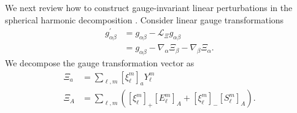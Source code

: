 \documentclass[12pt]{report}
\begin{document}
We next review how to construct gauge-invariant linear perturbations
in the spherical harmonic decomposition \cite{Martel:2005ir}.
Consider linear gauge transformations
\begin{align}
    g^{\prime}_{\alpha\beta}
    &= 
    g_{\alpha\beta}
    -
    \mathcal{L}_{\Xi}g_{\alpha\beta}
    \nonumber\\
    &= 
    g_{\alpha\beta}
    -
    \nabla_{\alpha}\Xi_{\beta}
    -
    \nabla_{\beta}\Xi_{\alpha}
    .
\end{align}
We decompose the gauge transformation vector as
\begin{subequations}
\begin{align}
    \Xi_a
    &=
    \sum_{\ell,m} \left[\xi^m_{\ell}\right]_a Y^m_{\ell}
    \\
    \Xi_A
    &=
    \sum_{\ell,m}\left(
        \left[\xi^m_{\ell}\right]_+ \left[E^m_{\ell}\right]_A
        +
        \left[\xi^m_{\ell}\right]_- \left[S^m_{\ell}\right]_A
    \right)
    .
\end{align}
\end{subequations}
\end{document}
